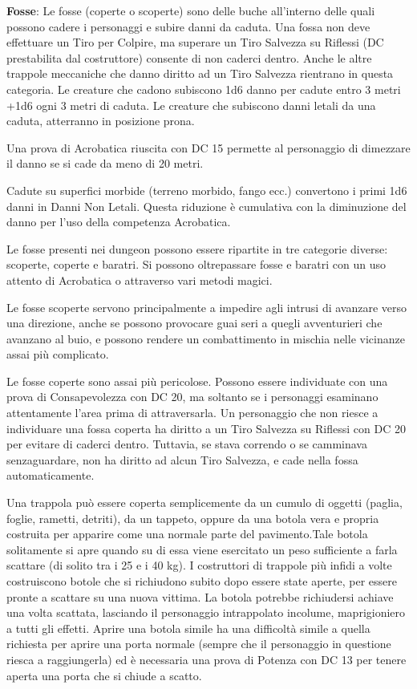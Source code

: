 \documentclass[a4paper,11pt,twoside,openany]{book}
\begin{document}
\textbf{Fosse}: Le fosse (coperte o scoperte) sono delle buche all'interno delle quali possono cadere i personaggi e subire danni da caduta. Una fossa non deve effettuare un Tiro per Colpire, ma superare un Tiro Salvezza su Riflessi (DC prestabilita dal costruttore) consente di non caderci dentro. Anche le altre trappole meccaniche che danno diritto ad un Tiro Salvezza rientrano in questa categoria. Le creature che cadono subiscono 1d6 danno per cadute entro 3 metri +1d6 ogni 3 metri di caduta. Le creature che subiscono danni letali da una caduta,
atterranno in posizione prona.

Una prova di Acrobatica riuscita con DC 15 permette al personaggio di dimezzare il danno se si cade da meno di 20 metri.

Cadute su superfici morbide (terreno morbido, fango ecc.) convertono i primi 1d6 danni in Danni Non Letali. Questa riduzione è cumulativa con la diminuzione del danno per l'uso della competenza Acrobatica.

Le fosse presenti nei dungeon possono essere ripartite in tre categorie diverse: scoperte, coperte e baratri. Si possono oltrepassare fosse e baratri con un uso attento di Acrobatica o attraverso vari metodi magici.

Le fosse scoperte servono principalmente a impedire agli intrusi di avanzare verso una direzione, anche se possono provocare guai seri a quegli avventurieri che avanzano al buio, e possono rendere un combattimento in mischia nelle vicinanze assai più complicato.

Le fosse coperte sono assai più pericolose. Possono essere individuate con una prova di Consapevolezza con DC 20, ma soltanto se i personaggi esaminano attentamente l'area prima di attraversarla. Un personaggio che non riesce a individuare una fossa coperta ha diritto a un Tiro Salvezza su Riflessi con DC 20 per evitare di caderci dentro. Tuttavia, se stava correndo o se camminava senzaguardare, non ha diritto ad alcun Tiro Salvezza, e cade nella fossa automaticamente.

Una trappola può essere coperta semplicemente da un cumulo di oggetti (paglia, foglie, rametti, detriti), da un tappeto, oppure da una botola vera e propria costruita per apparire come una normale parte del pavimento.Tale botola solitamente si apre quando su di essa viene esercitato un peso sufficiente a farla scattare (di solito tra i 25 e i 40 kg). I costruttori di trappole più infidi a volte costruiscono botole che si richiudono subito dopo essere state aperte, per essere pronte a scattare su una nuova vittima. La botola potrebbe richiudersi achiave una volta scattata, lasciando il personaggio intrappolato incolume, maprigioniero a tutti gli effetti. Aprire una botola simile ha una difficoltà simile a quella richiesta per aprire una porta normale (sempre che il personaggio in questione riesca a raggiungerla) ed è necessaria una prova di Potenza con DC 13 per tenere aperta una porta che si chiude a scatto.
\end{document}
